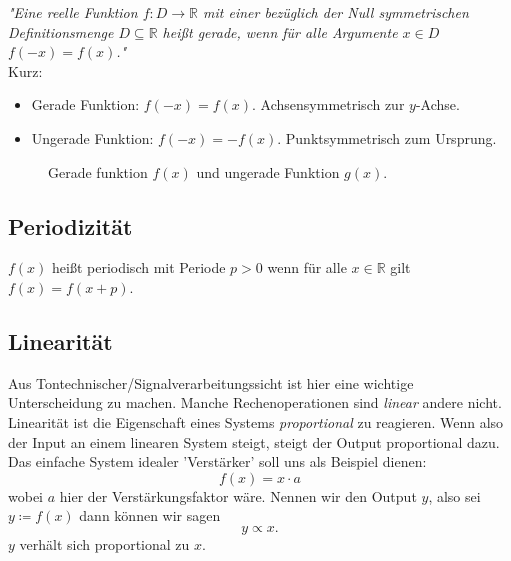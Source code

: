 \emph{"Eine reelle Funktion $f\colon D\to \mathbb {R} $ mit einer bezüglich der Null symmetrischen Definitionsmenge 
$ D\subseteq \mathbb {R}$ heißt gerade, wenn für alle Argumente $ x\in D$  $f(-x)=f(x)$."} \\

Kurz:
\begin{itemize}
    \item Gerade Funktion:  $f(-x) = f(x)$. Achsensymmetrisch zur $y$-Achse.
    \item Ungerade Funktion:  $f(-x) = -f(x)$. Punktsymmetrisch zum Ursprung.
\end{itemize}

    \begin{figure}[H]
        \centering
        
        \caption{Gerade funktion $f(x)$ und ungerade Funktion $g(x)$.}
        \label{fig:evenUneven}
    \end{figure}







\subsection{Periodizität}
$f(x)$ heißt periodisch mit Periode $p>0$ wenn für alle $ x \in \mathbb{R}$ gilt $f(x) = f(x+p)$.

\subsection{Linearität}
Aus Tontechnischer/Signalverarbeitungssicht ist hier eine wichtige Unterscheidung zu machen. Manche Rechenoperationen sind \emph{linear} andere nicht. 
Linearität ist die Eigenschaft eines Systems \emph{proportional} zu reagieren.
Wenn also der Input an einem linearen System steigt, steigt der Output proportional dazu. Das einfache System idealer 'Verstärker' soll uns als Beispiel dienen:
$$f(x) = x \cdot a$$ wobei $a$ hier der Verstärkungsfaktor wäre. Nennen wir den Output $y$, also sei $y \coloneqq f(x)$ dann können wir sagen $$y \propto x.$$ 
$y$ verhält sich proportional zu $x$. 

